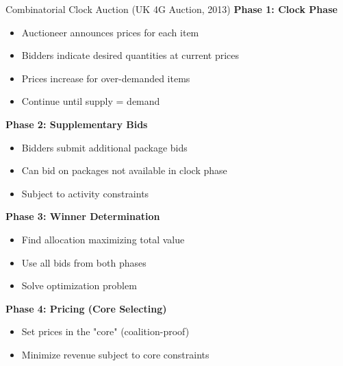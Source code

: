 \documentclass[xcolor={x11names}, aspectratio=169 ]{beamer}
\begin{document}
\begin{frame}{Combinatorial Clock Auction (UK 4G Auction, 2013)}
\textbf{Phase 1: Clock Phase}
\begin{itemize}
  \item Auctioneer announces prices for each item
  \item Bidders indicate desired quantities at current prices
  \item Prices increase for over-demanded items
  \item Continue until supply = demand
\end{itemize}

\textbf{Phase 2: Supplementary Bids}
\begin{itemize}
  \item Bidders submit additional package bids
  \item Can bid on packages not available in clock phase
  \item Subject to activity constraints
\end{itemize}

\textbf{Phase 3: Winner Determination}
\begin{itemize}
  \item Find allocation maximizing total value
  \item Use all bids from both phases
  \item Solve optimization problem
\end{itemize}

\textbf{Phase 4: Pricing (Core Selecting)}
\begin{itemize}
  \item Set prices in the "core" (coalition-proof)
  \item Minimize revenue subject to core constraints
\end{itemize}
\end{frame}
\end{document}
